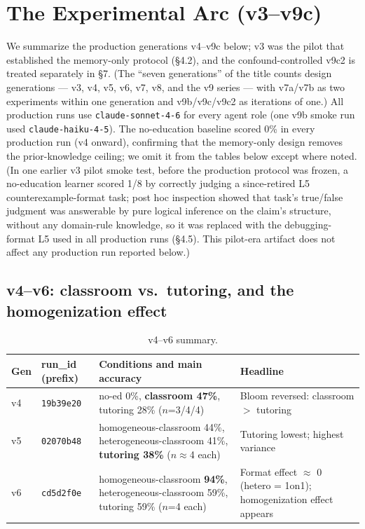 \documentclass[11pt]{article}
\begin{document}
\section{The Experimental Arc (v3--v9c)}

We summarize the production generations v4--v9c below; v3 was the pilot that
established the memory-only protocol (\S4.2), and the confound-controlled v9c2 is
treated separately in \S7.  (The ``seven generations'' of the title counts design
generations --- v3, v4, v5, v6, v7, v8, and the v9 series --- with v7a/v7b as two
experiments within one generation and v9b/v9c/v9c2 as iterations of one.)  All
production runs use
\texttt{claude-sonnet-4-6} for every agent role (one v9b smoke run used
\texttt{claude-haiku-4-5}).  The no-education baseline scored 0\% in every
production run (v4 onward), confirming that the memory-only design removes the
prior-knowledge ceiling; we omit it from the tables below except where noted.
(In one earlier v3 pilot smoke test, before the production protocol was frozen,
a no-education learner scored 1/8 by correctly judging a since-retired L5
counterexample-format task; post hoc inspection showed that task's true/false
judgment was answerable by pure logical inference on the claim's structure,
without any domain-rule knowledge, so it was replaced with the debugging-format
L5 used in all production runs (\S4.5).  This pilot-era artifact does not
affect any production run reported below.)

\subsection{v4--v6: classroom vs.\ tutoring, and the homogenization effect}

\begin{table}[h]
\centering
\caption{v4--v6 summary.}
\label{tab:v4-v6}
\begin{tabular}{@{}llp{6cm}p{4.5cm}@{}}
\toprule
Gen & run\_id (prefix) & Conditions and main accuracy & Headline \\
\midrule
v4 & \texttt{19b39e20} & no-ed 0\%, \textbf{classroom 47\%}, tutoring 28\% ($n$=3/4/4) & Bloom reversed: classroom $>$ tutoring \\
v5 & \texttt{02070b48} & homogeneous-classroom 44\%, heterogeneous-classroom 41\%, \textbf{tutoring 38\%} ($n$$\approx$4 each) & Tutoring lowest; highest variance \\
v6 & \texttt{cd5d2f0e} & homogeneous-classroom \textbf{94\%}, heterogeneous-classroom 59\%, tutoring 59\% ($n$=4 each) & Format effect $\approx$ 0 (hetero = 1on1); homogenization effect appears \\
\bottomrule
\end{tabular}
\end{table}
\end{document}
